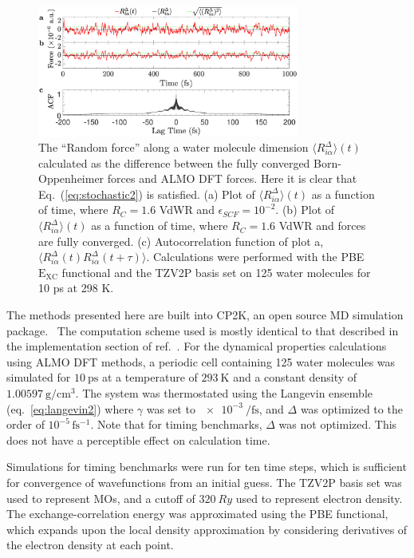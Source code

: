 \documentclass[aps,prl,reprint,amsmath,amssymb]{revtex4-1}
\begin{document}
\begin{figure}
\includegraphics[trim={0.6cm 0.7cm 0.7cm 0.3cm},clip,width=8.6cm]{DeltaForceComparison_with_ACF.eps}
\caption{\label{fig:randomforce}The ``Random force'' along a water molecule dimension $\langle R^{\Delta}_{i\alpha} \rangle (t)$ calculated as the difference between the fully converged Born-Oppenheimer forces and ALMO DFT forces. Here it is clear that Eq.\ (\ref{eq:stochastic2}) is satisfied. 
(a) Plot of $\langle R^{\Delta}_{i\alpha} \rangle (t)$ as a function of time, where $R_{C} = 1.6$ VdWR and $\epsilon_{SCF} = 10^{-2}$.
(b) Plot of $\langle R^{\Delta}_{i\alpha} \rangle (t)$ as a function of time, where $R_{C} = 1.6$ VdWR and forces are fully converged.
(c) Autocorrelation function of plot a, $\langle R^{\Delta}_{i\alpha} (t) R^{\Delta}_{i\alpha} (t+\tau) \rangle $. 
Calculations were performed with the PBE $\mathrm{E_{XC}}$ functional and the TZV2P basis set on 125 water molecules for 10 ps at 298 K.}
\end{figure}


The methods presented here are built into CP2K, an open source MD simulation package.~\cite{www:cp2k} 
The computation scheme used is mostly identical to that described in the implementation section of ref.\ . 
For the dynamical properties calculations using ALMO DFT methods, a periodic cell containing 125 water molecules was simulated for $\SI{10}{\ps}$ at a temperature of $\SI{293}{\K}$ and a constant density of $\SI{1.00597}{\g\per\cm^{3}}$. 
The system was thermostated using the Langevin ensemble (eq.\ \ref{eq:langevin2}) where $\gamma$ was set to $\SI{e-3}{\per\fs}$, and $\Delta$ was optimized to the order of $10^{-5}\, \mathrm{fs^{-1}}$. 
Note that for timing benchmarks, $\Delta$ was not optimized. 
This does not have a perceptible effect on calculation time.

Simulations for timing benchmarks were run for ten time steps, which is sufficient for convergence of wavefunctions from an initial guess.
The TZV2P basis set was used to represent MOs, and a cutoff of $\SI{320}{Ry}$ used to represent electron density. 
The exchange-correlation energy was approximated using the PBE functional, which expands upon the local density approximation by considering derivatives of the electron density at each point.~\cite{a:PBEfunctional} 
\end{document}
